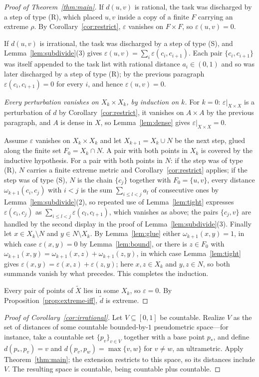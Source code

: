 \documentclass[11pt]{article}
\theoremstyle{definition}
\theoremstyle{remark}
\newcommand{\eps}{\varepsilon}
\begin{document}
\begin{proof}[Proof of Theorem~\ref{thm:main}]
If $d(u,v)$ is rational, the task was discharged by a step of type (R), which placed $u,v$
inside a copy of a finite $F$ carrying an extreme $\rho$. By Corollary~\ref{cor:restrict},
$\eps$ vanishes on $F\times F$, so $\eps(u,v)=0$.

If $d(u,v)$ is irrational, the task was discharged by a step of type (S), and
Lemma~\ref{lem:subdivide}(3) gives $\eps(u,v)=\sum_i\eps(c_i,c_{i+1})$. Each pair
$\{c_i,c_{i+1}\}$ was itself appended to the task list with rational distance $a_i\in(0,1)$
and so was later discharged by a step of type (R); by the previous paragraph
$\eps(c_i,c_{i+1})=0$ for every $i$, and hence $\eps(u,v)=0$.

\smallskip
\noindent\emph{Every perturbation vanishes on $X_k\times X_k$, by induction on $k$.}
For $k=0$: $\eps|_{X\times X}$ is a perturbation of $d$ by Corollary~\ref{cor:restrict}, it
vanishes on $A\times A$ by the previous paragraph, and $A$ is dense in $X$, so
Lemma~\ref{lem:dense} gives $\eps|_{X\times X}=0$.

Assume $\eps$ vanishes on $X_k\times X_k$ and let $X_{k+1}=X_k\cup N$ be the next step,
glued along the finite set $F_0=X_k\cap N$. A pair with both points in $X_k$ is covered by
the inductive hypothesis. For a pair with both points in $N$: if the step was of type (R),
$N$ carries a finite extreme metric and Corollary~\ref{cor:restrict} applies; if the step
was of type (S), $N$ is the chain $\{c_j\}$ together with $F_0=\{u,v\}$, every distance
$\omega_{k+1}(c_i,c_j)$ with $i<j$ is the sum $\sum_{i\le l<j}a_l$ of consecutive ones by
Lemma~\ref{lem:subdivide}(2), so repeated use of Lemma~\ref{lem:tight} expresses
$\eps(c_i,c_j)$ as $\sum_{i\le l<j}\eps(c_l,c_{l+1})$, which vanishes as above; the pairs
$\{c_j,v\}$ are handled by the second display in the proof of
Lemma~\ref{lem:subdivide}(3). Finally let $x\in X_k\setminus N$ and $y\in N\setminus X_k$.
By Lemma~\ref{lem:glue} either $\omega_{k+1}(x,y)=1$, in which case $\eps(x,y)=0$ by
Lemma~\ref{lem:bound}, or there is $z\in F_0$ with
$\omega_{k+1}(x,y)=\omega_{k+1}(x,z)+\omega_{k+1}(z,y)$, in which case
Lemma~\ref{lem:tight} gives $\eps(x,y)=\eps(x,z)+\eps(z,y)$; here $x,z\in X_k$ and
$y,z\in N$, so both summands vanish by what precedes. This completes the induction.

\smallskip
Every pair of points of $\tilde X$ lies in some $X_k$, so $\eps=0$. By
Proposition~\ref{prop:extreme-iff}, $\tilde d$ is extreme.
\end{proof}

\begin{proof}[Proof of Corollary~\ref{cor:irrational}]
Let $V\subseteq[0,1]$ be countable. Realize $V$ as the set of distances of some countable
bounded-by-$1$ pseudometric space---for instance, take a countable set $\{p_v\}_{v\in V}$
together with a base point $p_*$, and define $d(p_*,p_v)=v$ and $d(p_v,p_w)=\max\{v,w\}$
for $v\neq w$, an ultrametric. Apply Theorem~\ref{thm:main}; the extension restricts to
this space, so its distances include $V$. The resulting space is countable, being countable
plus countable.
\end{proof}
\end{document}
